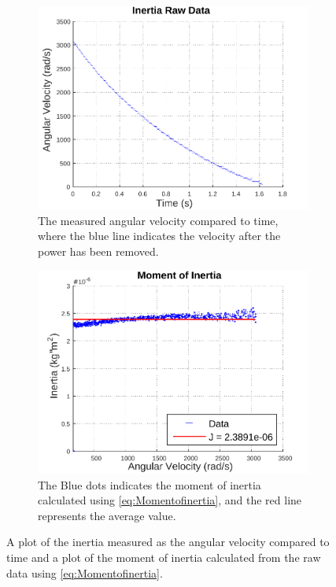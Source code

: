 \begin{figure}[H]
  \setcounter{subfigure}{0}
  \centering
  \begin{subfigure}{0.48\textwidth}
    \centering
    \includegraphics[width=1.2\linewidth]{figures/inertiaRawData.pdf}
    \caption{The measured angular velocity compared to time, where the blue line indicates the velocity after the power has been removed.}
    \label{inertiaRawData}
  \end{subfigure}
  \begin{subfigure}{0.48\textwidth}
    \centering
    \includegraphics[width=1.2\linewidth]{figures/momentOfInertia.pdf}
    \caption{The Blue dots indicates the moment of inertia calculated using \eqref{eq:Momentofinertia}, and the red line represents the average value.}
  	\label{momentOfInertia}
  \end{subfigure}
  \caption{A plot of the inertia measured as the angular velocity compared to time and a plot of the moment of inertia calculated from the raw data using \eqref{eq:Momentofinertia}.}
  \label{yo}
\end{figure}\vspace{-5mm}
